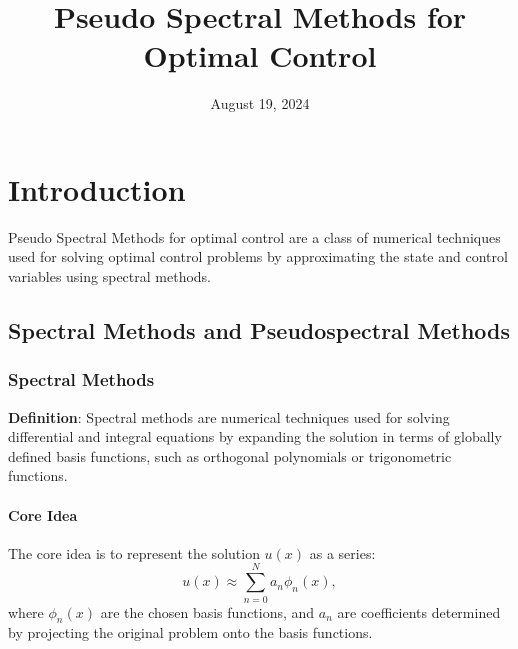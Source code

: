 \documentclass[12pt]{report} %
\title{Pseudo Spectral Methods for Optimal Control}
\date{August 19, 2024}
\author{}
\begin{document}
\maketitle

\tableofcontents

\listoffigures

\chapter{Introduction}
Pseudo Spectral Methods for optimal control are a class of numerical techniques used for solving optimal control problems by approximating the state and control variables using spectral methods.

\section{Spectral Methods and Pseudospectral Methods}

\subsection{Spectral Methods}

\textbf{Definition}: Spectral methods are numerical techniques used for solving differential and integral equations by expanding the solution in terms of globally defined basis functions, such as orthogonal polynomials or trigonometric functions.

\subsubsection{Core Idea}
The core idea is to represent the solution \( u(x) \) as a series:
\[
u(x) \approx \sum_{n=0}^{N} a_n \phi_n(x),
\]
where \( \phi_n(x) \) are the chosen basis functions, and \( a_n \) are coefficients determined by projecting the original problem onto the basis functions.
\end{document}
